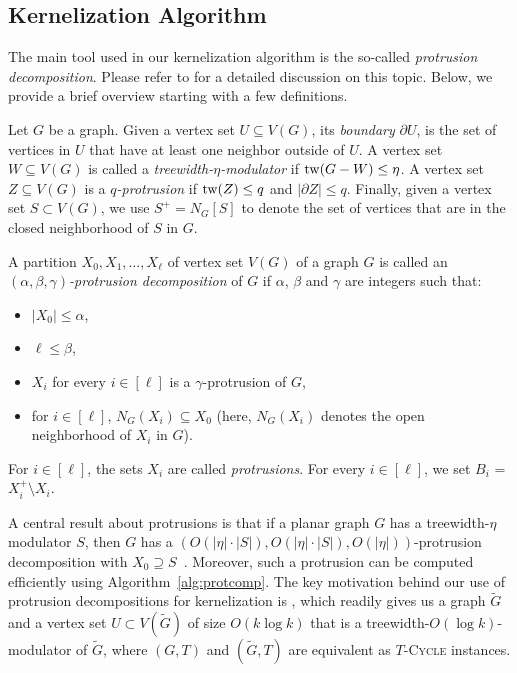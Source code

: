 \documentclass{article}
\newcommand{\tw}{{\rm tw}}
\numberwithin{claimcounter}{lemma}
\newcommand{\tcycle}{$T$-\textsc{Cycle}\xspace}
\begin{document}
  
\subsection{Kernelization Algorithm}

The main tool used in our kernelization algorithm is the so-called \emph{protrusion decomposition}. Please refer to \cite[Chapter 15]{kernelbook} for a detailed discussion on this topic. Below, we provide a brief overview  starting with a few definitions. 

Let $G$ be a graph.
Given a vertex set $U \subseteq V(G)$, its \emph{boundary} $\partial U$, is the set of vertices in $U$ that have at least one neighbor outside of $U$.   A vertex set $W \subseteq V(G)$ is called a \emph{treewidth-$\eta$-modulator} if $\tw(G-W) \leq \eta$. A vertex set $Z\subseteq V(G)$ is a \emph{$q$-protrusion} if $\tw(Z) \leq q$ and $|\partial Z| \leq q$. Finally, given a vertex set $S \subset V(G)$, we use $S^+ = N_G[S]$ to denote the set of vertices that are in the closed neighborhood of $S$ in $G$.

A partition $X_0,X_1,\dots,X_\ell$  of vertex set $V(G)$ of a graph $G$ is called an \emph{$(\alpha,\beta,\gamma)$-protrusion decomposition} of $G$ if $\alpha$, $\beta$ and $\gamma$ are integers such that:
\begin{itemize}
    \item $|X_0| \leq \alpha$,
    \item $\ell \leq \beta$,
    \item $X_i $ for every $i \in [\ell]$ is a $\gamma$-protrusion of $G$,
    \item for $i \in [\ell]$, $N_G(X_i) \subseteq X_0$ (here, $N_G(X_i)$ denotes the open neighborhood of $X_i$ in $G$).
\end{itemize}

For $i \in [\ell]$, the sets $X_i$ are called \emph{protrusions}.
For every $i \in [\ell]$, we set $B_i$ = $X_i^+ \setminus X_i$. 

A central result about protrusions is that if a planar graph $G$ has a treewidth-$\eta$ modulator $S$,  then $G$ has a $(O(|\eta| \cdot |S|),O(|\eta| \cdot |S|),O(|\eta|))$-protrusion decomposition with $X_0 \supseteq S$~\cite[Lemma 15.14]{kernelbook}. Moreover, such a protrusion can be computed efficiently using  Algorithm~\ref{alg:protcomp}. The key motivation behind our use of protrusion decompositions for kernelization is , which readily gives us a graph $\tilde{G}$ and a vertex set $U \subset V(\tilde{G})$ of size $O(k \log k)$ that is a treewidth-$O(\log k)$-modulator of $\tilde{G}$, where $(G,T)$ and  $(\tilde{G},T)$  are equivalent  as \tcycle instances. 
\end{document}
